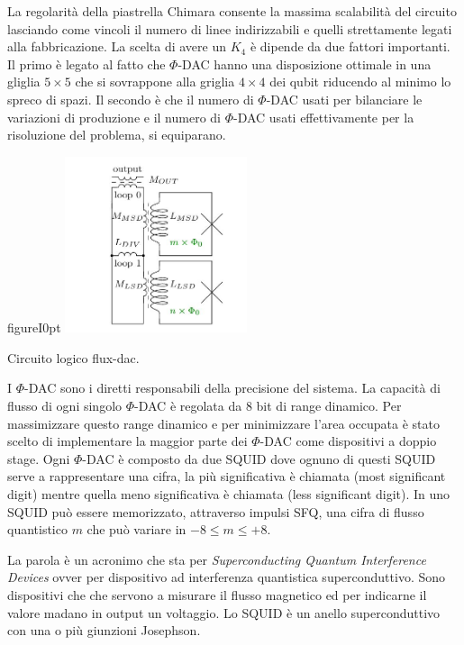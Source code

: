 La regolarità della piastrella Chimara consente la massima scalabilità del circuito lasciando come vincoli il numero di linee indirizzabili e quelli strettamente legati alla fabbricazione. La scelta di avere un $K_4$ è dipende da due fattori importanti. Il primo è legato al fatto che $\Phi$-DAC hanno una disposizione ottimale in una gliglia $5\times5$ che si sovrappone alla griglia $4\times4$ dei qubit riducendo al minimo lo spreco di spazi. Il secondo è che il numero di $\Phi$-DAC usati per bilanciare le variazioni di produzione e il numero di $\Phi$-DAC usati effettivamente per la risoluzione del problema, si equiparano.

\begin{wrapfloat}{figure}{I}{0pt}
\includegraphics[width=0.4\textwidth]{Immagini/fluxdac-logico.jpg}
\caption{Circuito logico flux-dac.}
\label{figura:fluxdac-logico}
\end{wrapfloat}
\cite{ACI}I $\Phi$-DAC sono i diretti responsabili della precisione del sistema. La capacità di flusso di ogni singolo $\Phi$-DAC è regolata da 8 bit di range dinamico. Per massimizzare questo range dinamico e per minimizzare l'area occupata è stato scelto di implementare la maggior parte dei $\Phi$-DAC come dispositivi a doppio stage. Ogni $\Phi$-DAC è composto da due SQUID dove ognuno di questi SQUID serve a rappresentare una cifra, la più significativa è chiamata  (most significant digit) mentre quella meno significativa è chiamata  (less significant digit). In uno SQUID può essere memorizzato, attraverso impulsi SFQ, una cifra di flusso quantistico $m$ che può variare in $-8 \le m \le +8$.

La parola \cite{SQD} è un acronimo che sta per \textit{Superconducting Quantum Interference Devices} ovver per dispositivo ad interferenza quantistica superconduttivo. Sono dispositivi che che servono a misurare il flusso magnetico ed per indicarne il valore madano in output un voltaggio. Lo SQUID è un anello superconduttivo con una o più giunzioni Josephson.


